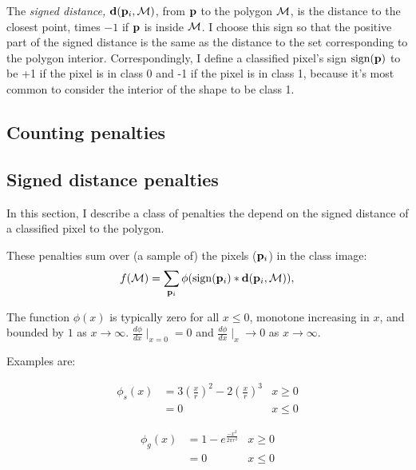 The {\em signed distance,} ${\mathbf d}({\mathbf p}_i,{\mathcal M})$, from ${\mathbf p}$ to the polygon ${\mathcal M}$,
is the distance to the closest point, times $-1$ if ${\mathbf p}$ is inside ${\mathcal M}$.
I choose this sign so that the positive part of the signed distance
is the same as the distance to the set corresponding to the polygon interior.
Correspondingly, I define a classified pixel's sign $\mathrm{sign}({\mathbf p})$ to be +1
if the pixel is in class 0 and -1 if the pixel is in class 1,
because it's most common to consider the interior of the shape
to be class 1.


\subsection{Counting penalties}
\label{sec:counting-penalties}


\subsection{Signed distance penalties}
\label{sec:signed-distance-penalties}

In this section, I describe a class of penalties the depend on the
signed distance of a classified pixel to the polygon.

These penalties sum over (a sample of) the pixels (${\mathbf p}_i$) in the class image:
\begin{equation}
f({\mathcal M}) = \sum_{{\mathbf p}_i} \phi( \mathrm{sign}({\mathbf p}_i) \ast {\mathbf d}({\mathbf p}_i,{\mathcal M}) ) ,
\end{equation}

The function $\phi(x)$ is typically zero for all $x \le 0$,
monotone increasing in $x$, and bounded by $1$ as $x\rightarrow\infty$.
$\frac{d\phi}{dx}\mid_{x=0} = 0$ and $\frac{d\phi}{dx}\mid_{x} \rightarrow 0$
as $x\rightarrow\infty$.

Examples are:

\begin{eqnarray}
\phi_s(x) & = 3 \left(\frac{x}{r}\right)^2 - 2 \left(\frac{x}{r}\right)^3 & {x \geq 0} \\
          & = 0 & {x \leq 0}
\end{eqnarray}

\begin{eqnarray}
\phi_g(x) & = 1 - e^{ \frac{-x^2}{2\pi r^2} } & x \geq 0 \\
          & = 0                               & x \leq 0 \nonumber
\end{eqnarray}

